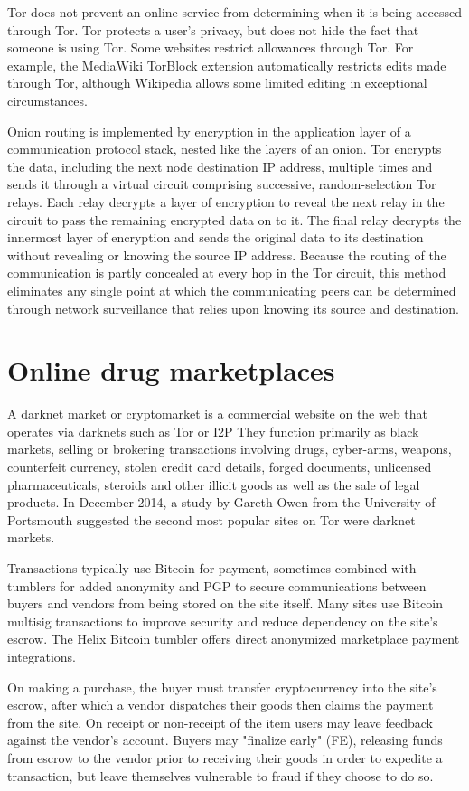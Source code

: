 \documentclass[
  digital, %
  table,   %
  lof,     %
  lot,     %
  oneside
]{fithesis3}
\begin{document}
Tor does not prevent an online service from determining when it is being accessed through Tor. Tor protects a user's privacy,
but does not hide the fact that someone is using Tor. Some websites restrict allowances through Tor. For example, the MediaWiki TorBlock extension automatically restricts edits made through Tor,
although Wikipedia allows some limited editing in exceptional circumstances.

Onion routing is implemented by encryption in the application layer of a communication protocol stack, nested like the layers of an onion. 
Tor encrypts the data, including the next node destination IP address, multiple times and sends it through a virtual circuit comprising successive, random-selection Tor relays.
Each relay decrypts a layer of encryption to reveal the next relay in the circuit to pass the remaining encrypted data on to it. The final relay decrypts the innermost layer of encryption and sends
the original data to its destination without revealing or knowing the source IP address. Because the routing of the communication is partly concealed at every hop in the Tor circuit,
this method eliminates any single point at which the communicating peers can be determined through network surveillance that relies upon knowing its source and destination.

\section{Online drug marketplaces}
A darknet market or cryptomarket is a commercial website on the web that operates via darknets such as Tor or I2P
They function primarily as black markets, selling or brokering transactions involving drugs, cyber-arms, weapons,
counterfeit currency, stolen credit card details, forged documents, unlicensed pharmaceuticals, steroids and
other illicit goods as well as the sale of legal products. In December 2014, a study by Gareth Owen from the University
of Portsmouth suggested the second most popular sites on Tor were darknet markets.

Transactions typically use Bitcoin for payment, sometimes combined with tumblers for added anonymity and PGP to secure communications
between buyers and vendors from being stored on the site itself. Many sites use Bitcoin multisig transactions 
to improve security and reduce dependency on the site's escrow. The Helix Bitcoin tumbler offers direct anonymized marketplace payment integrations.

On making a purchase, the buyer must transfer cryptocurrency into the site's escrow, after which a vendor dispatches their goods then claims the
payment from the site. On receipt or non-receipt of the item users may leave feedback against the vendor's account. Buyers may "finalize early"
(FE), releasing funds from escrow to the vendor prior to receiving their goods in order to expedite a transaction, but leave themselves vulnerable to fraud if they choose to do so.
\end{document}
